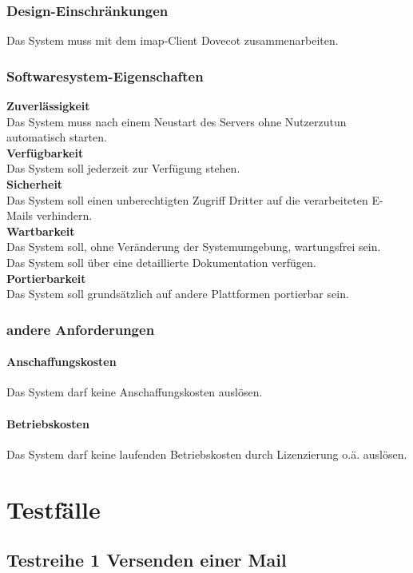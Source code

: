 \subsection{Design-Einschränkungen}
Das System muss mit dem \ac{imap}-Client Dovecot zusammenarbeiten.
\subsection{Softwaresystem-Eigenschaften}
\label{sec:zuverl}
\textbf{Zuverlässigkeit} \\
Das System muss nach einem Neustart des Servers ohne Nutzerzutun automatisch starten.\\
\textbf{Verfügbarkeit} \\
Das System soll jederzeit zur Verfügung stehen.\\
\textbf{Sicherheit} \\
Das System soll einen unberechtigten Zugriff Dritter auf die verarbeiteten E-Mails verhindern.\\
\textbf{Wartbarkeit} \\
Das System soll, ohne Veränderung der Systemumgebung, wartungsfrei sein.\\
Das System soll über eine detaillierte Dokumentation verfügen.\\
\textbf{Portierbarkeit} \\
Das System soll grundsätzlich auf andere Plattformen portierbar sein.\\

\subsection{andere Anforderungen}
\subsubsection*{Anschaffungskosten}
Das System darf keine Anschaffungskosten auslösen.
\subsubsection*{Betriebskosten}
Das System darf keine laufenden Betriebskosten durch Lizenzierung o.ä. auslösen.


\chapter{Testfälle}
\label{ch:Testfaelle}

\section{Testreihe 1 Versenden einer Mail}
